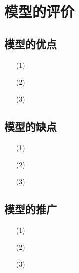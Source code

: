 \section{模型的评价}

\subsection{模型的优点}%

\begin{itemize}
	
	\item[(1)] 
	
	\item[(2)] 
	
	\item[(3)] 
	
\end{itemize}	

\subsection{模型的缺点}

\begin{itemize}
	
	\item[(1)] 
	
	\item[(2)] 
	
	\item[(3)] 
	
\end{itemize}	
\subsection{模型的推广}


\begin{itemize}
	
	\item[(1)] 
	
	\item[(2)] 
	
	\item[(3)] 
	
\end{itemize}	